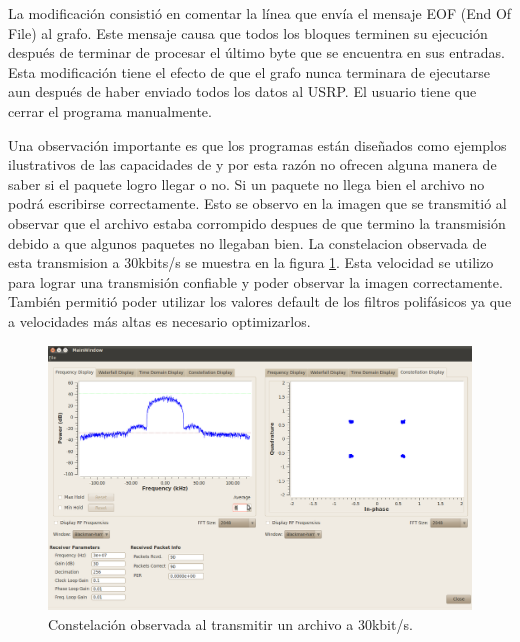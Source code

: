 La modificaci\'on consisti\'o en comentar la l\'inea que env\'ia el mensaje EOF (End Of File) al
grafo. Este mensaje causa que todos los bloques terminen su ejecuci\'on despu\'es de terminar de
procesar el \'ultimo byte que se encuentra en sus entradas. Esta modificaci\'on tiene el efecto de
que el grafo nunca terminara de ejecutarse aun despu\'es de haber enviado todos los datos al USRP.
El usuario tiene que cerrar el programa manualmente.

Una observaci\'on importante es que los programas est\'an dise\~nados como ejemplos ilustrativos de
las capacidades de \gnuradio y por esta raz\'on no ofrecen alguna manera de saber si el paquete
logro llegar o no. Si un paquete no llega bien el archivo no podr\'a escribirse correctamente. Esto
se observo en la imagen que se transmiti\'o al observar que el archivo estaba corrompido
despues de que termino la transmisi\'on debido a que algunos paquetes no llegaban bien. La
constelacion observada de esta transmision a 30kbits/s se muestra en la figura \ref{fig:fileconst}.
Esta velocidad se utilizo para lograr una transmisi\'on confiable y poder observar la imagen
correctamente. Tambi\'en permiti\'o poder utilizar los valores default de los filtros polif\'asicos
ya que a velocidades m\'as altas es necesario optimizarlos.

\begin{figure}[htp]
  \centering
  \includegraphics[width=5.8in]{figs/fileconst}
  \vspace{0.3in}
  \caption{Constelaci\'on observada al transmitir un archivo a 30kbit/s.}
  \label{fig:fileconst}
\end{figure}
